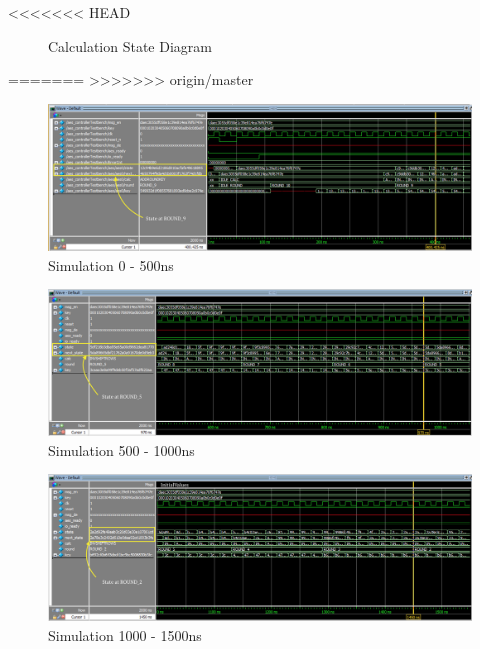 \documentclass[journal, twocolumn, final,11pt,letterpaper]{IEEEtran}
\begin{document}
<<<<<<< HEAD
\begin{figure} [H]
	\centering
	\caption{Calculation State Diagram\label{fig:calc-state}}
\end{figure}    
=======
>>>>>>> origin/master



\begin{figure} [H]
	\centering
	\includegraphics[scale=.35]{simulate-0-500.png}
	\caption{Simulation 0 - 500ns\label{fig:0-500}}
\end{figure}          


\begin{figure} [H]
	\centering
	\includegraphics[scale=.35]{simulate-500-1000.png}
	\caption{Simulation 500 - 1000ns\label{fig:500-1000}}
\end{figure}          


\begin{figure} [H]
	\centering
	\includegraphics[scale=.35]{simulate-1000-1500.png}
	\caption{Simulation 1000 - 1500ns\label{fig:1000-1500}}
\end{figure}          
\end{document}

